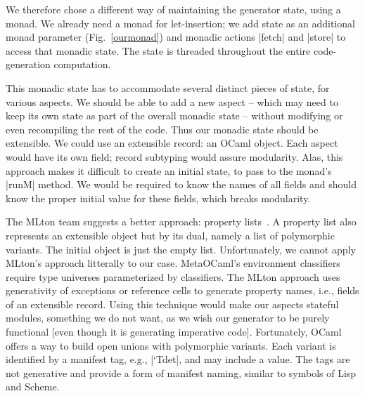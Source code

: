 \documentclass{elsart}
\begin{document}
We therefore chose a different way of maintaining the generator state,
using a monad. We already need a monad for let-insertion; we add state as
an additional monad parameter (Fig.~\ref{ourmonad}) and monadic
actions |fetch| and |store| to access that monadic state. The state is
threaded throughout the entire code-generation computation. 

This monadic state has to accommodate several distinct pieces of state, for
various aspects. We should be able to add a new aspect -- which may need
to keep its own state as part of the overall monadic state -- without
modifying or even recompiling the rest of the code. Thus our monadic
state should be extensible. We could use an extensible
record: an OCaml object. Each aspect would have its own field; record
subtyping would assure modularity. Alas, this approach makes it
difficult to create an initial state, to pass to the monad's |runM|
method. We would be required to know the names of all fields and should know
the proper initial value for these fields, which breaks modularity.

The MLton team suggests a better approach: property 
lists~\cite{mlton-proplist}.  A property list also represents an
extensible object but by its dual, namely a list of polymorphic variants.  The
initial object is just the empty list.  Unfortunately, we cannot apply
MLton's approach litterally to our case.  MetaOCaml's environment classifiers
require type universes parameterized by classifiers. The MLton
approach uses generativity of exceptions or reference cells to
generate property names, i.e., fields of an extensible record. Using this
technique would make our aspects stateful modules, something we do not
want, as we wish our generator to be purely functional [even though it is
generating imperative code].
Fortunately, OCaml offers a way to build open unions with
polymorphic variants. Each variant is identified by a manifest tag,
e.g., |`Tdet|, and may include a value. The tags are not generative and
provide a form of manifest naming, similar to symbols of
Lisp and Scheme.
\end{document}
